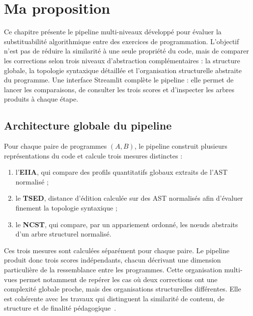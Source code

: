 {

\chapter{Ma proposition}

Ce chapitre présente le pipeline multi-niveaux développé pour évaluer la
substituabilité algorithmique entre des exercices de programmation. L'objectif
n'est pas de réduire la similarité à une seule propriété du code, mais de
comparer les corrections selon trois niveaux d'abstraction complémentaires : la
structure globale, la topologie syntaxique détaillée et l'organisation
structurelle abstraite du programme. Une interface Streamlit complète le
pipeline : elle permet de lancer les comparaisons, de consulter les trois
scores et d'inspecter les arbres produits à chaque étape.

\section{Architecture globale du pipeline}

Pour chaque paire de programmes $(A,B)$, le pipeline construit plusieurs
représentations du code et calcule trois mesures distinctes :
\begin{enumerate}
  \item l'\textbf{EIIA}, qui compare des profils quantitatifs globaux extraits
        de l'AST normalisé ;
  \item le \textbf{TSED}, distance d'édition calculée sur des AST normalisés
        afin d'évaluer finement la topologie syntaxique ;
  \item le \textbf{NCST}, qui compare, par un appariement ordonné, les nœuds
        abstraits d'un arbre structurel normalisé.
\end{enumerate}

Ces trois mesures sont calculées séparément pour chaque paire. Le pipeline
produit donc trois scores indépendants, chacun décrivant une dimension
particulière de la ressemblance entre les programmes. Cette organisation
multi-vues permet notamment de repérer les cas où deux corrections ont une
complexité globale proche, mais des organisations structurelles différentes.
Elle est cohérente avec les travaux qui distinguent la similarité de contenu,
de structure et de finalité pédagogique~\cite{TODO_ref1,TODO_ref2}.

}
